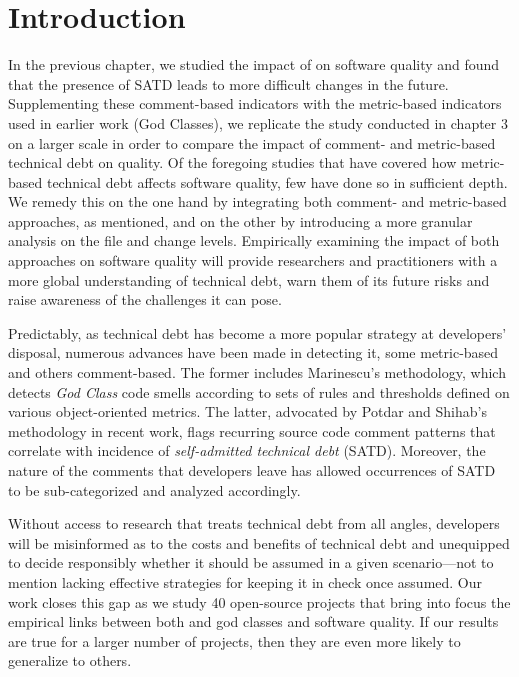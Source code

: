 \section{Introduction}
\label{chap4:sec:introduction}
\setlength\parindent{24pt} 

\revision In the previous chapter, we studied the impact of \SATD on software quality and found that the presence of SATD leads to more difficult changes in the future. Supplementing these comment-based indicators with the metric-based indicators used in earlier work \cite{zazworka2011investigating} (God Classes), we replicate the study conducted in chapter 3 on a larger scale in order to compare the impact of comment- and metric-based technical debt on quality. Of the foregoing studies that have covered how metric-based technical debt affects software quality, few have done so in sufficient depth. We remedy this on the one hand by integrating both comment- and metric-based approaches, as mentioned, and on the other by introducing a more granular analysis on the file and change levels. Empirically examining the impact of both approaches on software quality will provide researchers and practitioners with a more global understanding of technical debt, warn them of its future risks and raise awareness of the challenges it can pose.

Predictably, as technical debt has become a more popular strategy at developers' disposal, numerous advances have been made in detecting it, some metric-based and others comment-based. The former includes Marinescu's \cite{marinescu2004detection} methodology, which detects \textit{God Class} code smells according to sets of rules and thresholds defined on various object-oriented metrics. The latter, advocated by Potdar and Shihab's \cite{ICSM_PotdarS14} methodology in recent work, flags recurring source code comment patterns that correlate with incidence of \textit{self-admitted technical debt} (SATD). Moreover, the nature of the comments that developers leave has allowed occurrences of SATD to be sub-categorized and analyzed accordingly.

Without access to research that treats technical debt from all angles, developers will be misinformed as to the costs and benefits of technical debt and unequipped to decide responsibly whether it should be assumed in a given scenario---not to mention lacking effective strategies for keeping it in check once assumed. Our work closes this gap as we study 40 open-source projects that bring into focus the empirical links between both \SATD and god classes and software quality. \revision If our results are true for a larger number of projects, then they are even more likely to generalize to others. 

